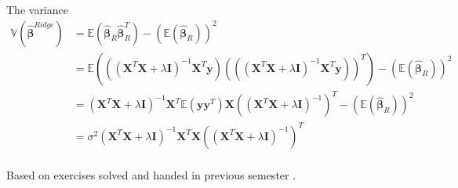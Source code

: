 The variance 
\begin{align*}
    \mathbb{V}(\mathbf{\hat{\beta}}^{Ridge}) &= \mathbb{E} (\mathbf{\hat{\beta}}_{R} \mathbf{\hat{\beta}}_{R}^{T}) - (\mathbb{E} (\mathbf{\hat{\beta}}_{R}))^{2} \\
    &= \mathbb{E} (((\mathbf{X}^{T}\mathbf{X} + \lambda \mathbf{I})^{-1} \mathbf{X}^{T} \mathbf{y}) (((\mathbf{X}^{T}\mathbf{X} + \lambda \mathbf{I})^{-1} \mathbf{X}^{T} \mathbf{y}))^{T}) - (\mathbb{E} (\mathbf{\hat{\beta}}_{R}))^{2} \\
    &= (\mathbf{X}^{T}\mathbf{X} + \lambda \mathbf{I})^{-1} \mathbf{X}^{T} \mathbb{E} (\mathbf{y} \mathbf{y}^{T} ) \mathbf{X} ((\mathbf{X}^{T}\mathbf{X} + \lambda \mathbf{I})^{-1})^{T} - (\mathbb{E} (\mathbf{\hat{\beta}}_{R}))^{2} \\
    &= \sigma^{2}(\mathbf{X}^{T}\mathbf{X} + \lambda \mathbf{I})^{-1} \mathbf{X}^{T} \mathbf{X} ((\mathbf{X}^{T}\mathbf{X} + \lambda \mathbf{I})^{-1})^{T} \\
\end{align*}

Based on exercises solved and handed in previous semester \cite{willumsen:2023:projects}.